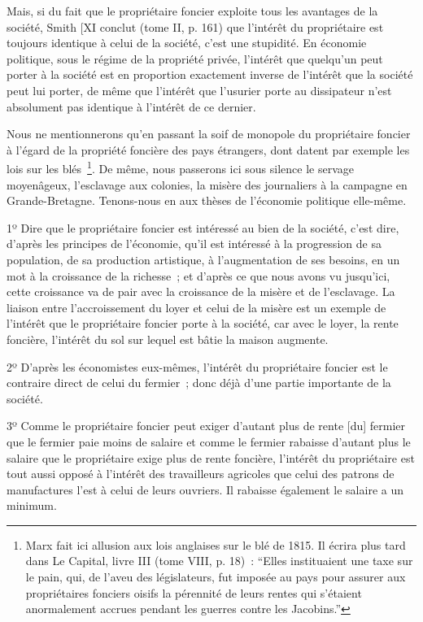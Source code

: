 \documentclass[french,twoside]{book} %
\begin{document}
\noindent Mais, si du fait que le propriétaire foncier exploite tous les avantages de la société, Smith [XI conclut (tome II, p. 161) que l’intérêt du propriétaire est toujours identique à celui de la société, c’est une stupidité. En économie politique, sous le régime de la propriété privée, l’intérêt que quelqu’un peut porter à la société est en proportion exactement inverse de l’intérêt que la société peut lui porter, de même que l’intérêt que l’usurier porte au dissipateur n’est absolument pas identique à l’intérêt de ce dernier.\par
Nous ne mentionnerons qu’en passant la soif de monopole du propriétaire foncier à l’égard de la propriété foncière des pays étrangers, dont datent par exemple les lois sur les blés \footnote{Marx fait ici allusion aux lois anglaises sur le blé de 1815. Il écrira plus tard dans Le Capital, livre III (tome VIII, p. 18) : “Elles instituaient une taxe sur le pain, qui, de l’aveu des législateurs, fut imposée au pays pour assurer aux propriétaires fonciers oisifs la pérennité de leurs rentes qui s’étaient anormalement accrues pendant les guerres contre les Jacobins.”}. De même, nous passerons ici sous silence le servage moyenâgeux, l’esclavage aux colonies, la misère des journaliers à la campagne en Grande-Bretagne. Tenons-nous en aux thèses de l’économie politique elle-même.\par
1º Dire que le propriétaire foncier est intéressé au bien de la société, c’est dire, d’après les principes de l’économie, qu’il est intéressé à la progression de sa population, de sa production artistique, à l’augmentation de ses besoins, en un mot à la croissance de la richesse ; et d’après ce que nous avons vu jusqu’ici, cette croissance va de pair avec la croissance de la misère et de l’esclavage. La liaison entre l’accroissement du loyer et celui de la misère est un exemple de l’intérêt que le propriétaire foncier porte à la société, car avec le loyer, la rente foncière, l’intérêt du sol sur lequel est bâtie la maison augmente.\par
2º D’après les économistes eux-mêmes, l’intérêt du propriétaire foncier est le contraire direct de celui du fermier ; donc déjà d’une partie importante de la société.\par
[XI] 3º Comme le propriétaire foncier peut exiger d’autant plus de rente [du] fermier que le fermier paie moins de salaire et comme le fermier rabaisse d’autant plus le salaire que le propriétaire exige plus de rente foncière, l’intérêt du propriétaire est tout aussi opposé à l’intérêt des travailleurs agricoles que celui des patrons de manufactures l’est à celui de leurs ouvriers. Il rabaisse également le salaire a un minimum.\par
\end{document}
